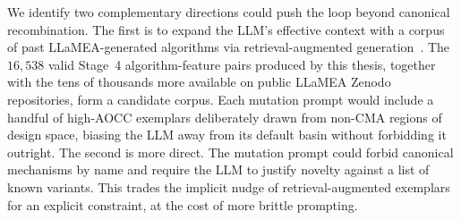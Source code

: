 We identify two complementary directions could push the loop beyond canonical recombination. The first is to expand the LLM's effective context with a corpus of past LLaMEA-generated algorithms via retrieval-augmented generation~\cite{rag2020,ragcode2021}. The $16{,}538$ valid Stage~4 algorithm-feature pairs produced by this thesis, together with the tens of thousands more available on public LLaMEA Zenodo repositories, form a candidate corpus. Each mutation prompt would include a handful of high-AOCC exemplars deliberately drawn from non-CMA regions of design space, biasing the LLM away from its default basin without forbidding it outright. The second is more direct. The mutation prompt could forbid canonical mechanisms by name and require the LLM to justify novelty against a list of known variants. This trades the implicit nudge of retrieval-augmented exemplars for an explicit constraint, at the cost of more brittle prompting.
